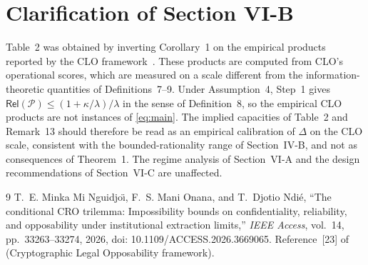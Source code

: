 \documentclass[10pt,a4paper]{article}
\theoremstyle{remark}
\newcommand{\Rel}{\mathsf{Rel}}
\newcommand{\cP}{\mathcal{P}}
\begin{document}
\section{Clarification of Section VI-B}

Table~2 was obtained by inverting Corollary~1 on the empirical products
reported by the CLO framework~\cite{clo}. These products are computed from
CLO's operational scores, which are measured on a scale different from the
information-theoretic quantities of Definitions~7--9. Under Assumption~4,
Step~1 gives $\Rel(\cP)\le(1+\kappa/\lambda)/\lambda$ in the sense of
Definition~8, so the empirical CLO products are not instances of
\eqref{eq:main}. The implied capacities of Table~2 and Remark~13 should
therefore be read as an empirical calibration of $\Delta$ on the CLO scale,
consistent with the bounded-rationality range of Section~IV-B, and not as
consequences of Theorem~1. The regime analysis of Section~VI-A and the
design recommendations of Section~VI-C are unaffected.

\begin{thebibliography}{9}
T.~E. Minka Mi Nguidjo\"{\i}, F.~S. Mani Onana, and T.~Djotio Ndi\'e,
``The conditional CRO trilemma: Impossibility bounds on confidentiality,
reliability, and opposability under institutional extraction limits,''
\emph{IEEE Access}, vol.~14, pp.~33263--33274, 2026,
doi: 10.1109/ACCESS.2026.3669065.
Reference~[23] of~\cite{orig} (Cryptographic Legal Opposability framework).
\end{thebibliography}
\end{document}
